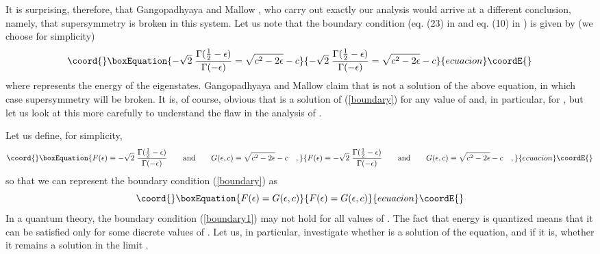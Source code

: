 \documentclass[a4paper,amssymb,aps]{revtex4}
\begin{document}
It is surprising, therefore, that Gangopadhyaya and Mallow
\cite{asim}, who carry out exactly our analysis would
arrive at 
a different conclusion, namely, that supersymmetry is broken in this
system. Let us note that the boundary condition (eq. (23) in
\cite{das} and eq. (10) in \cite{asim}) is given by (we choose
\coordHE{} for simplicity)
\begin{equation}\coord{}\boxEquation{
- \sqrt{2}\;\frac{\Gamma(\frac{1}{2}-\epsilon)}{\Gamma (-\epsilon)} =
\sqrt{c^{2}-2\epsilon} - c\label{boundary}
}{
- \sqrt{2}\;\frac{\Gamma(\frac{1}{2}-\epsilon)}{\Gamma (-\epsilon)} =
\sqrt{c^{2}-2\epsilon} - c}{ecuacion}\coordE{}\end{equation}
where \myHighlight{$\epsilon$}\coordHE{} represents the energy of the
eigenstates. Gangopadhyaya and Mallow claim that \coordHE{} is not
a solution of the above equation, in which case 
supersymmetry will be broken. It is, of course, obvious that \coordHE{} is a solution of (\ref{boundary}) for any value of \coordHE{} and, in
particular, for \coordHE{}, but let us look at this more
carefully to understand the flaw in the analysis of \cite{asim}.

Let us define, for simplicity,
\begin{equation}\coord{}\boxEquation{
F(\epsilon) \equiv - \sqrt{2}\; \frac{ \Gamma (\frac{1}{2} - \epsilon)}{\Gamma
(-\epsilon)} \qquad {\mathrm{and}} \qquad  G(\epsilon, c) \equiv \sqrt{c^2 - 2
\epsilon} - c \quad ,
}{
F(\epsilon) \equiv - \sqrt{2}\; \frac{ \Gamma (\frac{1}{2} - \epsilon)}{\Gamma
(-\epsilon)} \qquad {\mathrm{and}} \qquad  G(\epsilon, c) \equiv \sqrt{c^2 - 2
\epsilon} - c \quad ,
}{ecuacion}\coordE{}\end{equation}
so that we can represent the boundary condition (\ref{boundary}) as
\begin{equation}\coord{}\boxEquation{
F(\epsilon) = G (\epsilon,c)\label{boundary1}
}{
F(\epsilon) = G (\epsilon,c)}{ecuacion}\coordE{}\end{equation}
In a quantum theory, the boundary condition (\ref{boundary1}) may not
hold for all values of \myHighlight{$\epsilon$}\coordHE{}.  The fact that energy is quantized means
that it can be satisfied only for some discrete values of
\coordHE{}.   Let us, in
particular, investigate whether \coordHE{} is a solution of the
equation, and if it is, whether it remains a solution
in the limit \coordHE{}.
\end{document}
